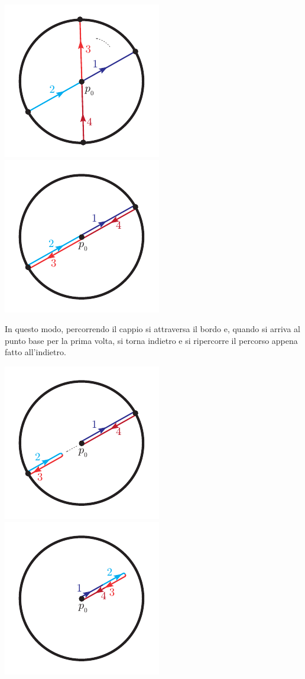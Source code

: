 \begin{itemize}
\begin{center}
			\includegraphics[trim=0cm 0cm 0cm 0cm,clip,scale=0.95]{images/projdiscdouble2.pdf}
			\includegraphics[trim=0cm 0cm 0cm 0cm,clip,scale=0.95]{images/projdiscdouble3.pdf}
		\end{center}
		In questo modo, percorrendo il cappio si attraversa il bordo e, quando si arriva al punto base per la prima volta, si torna indietro e si ripercorre il percorso appena fatto all'indietro. 
		\begin{center}
			\includegraphics[trim=0cm 0cm 0cm 0cm,clip,scale=0.95]{images/projdiscdouble4.pdf}
			\includegraphics[trim=0cm 0cm 0cm 0cm,clip,scale=0.95]{images/projdiscdouble5.pdf}

\end{center}
\end{itemize}
